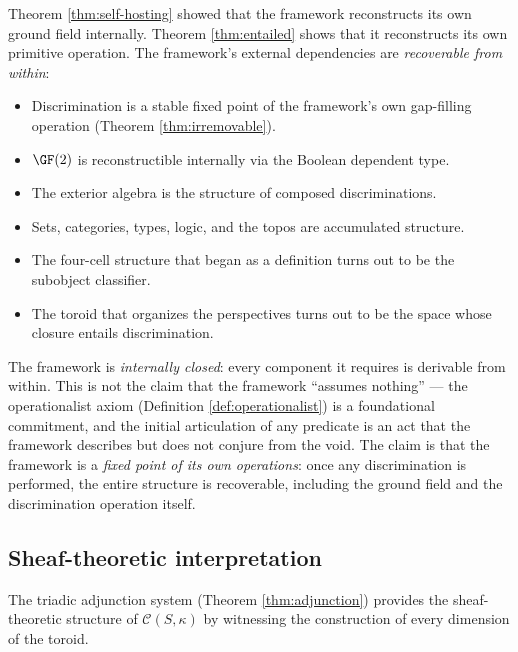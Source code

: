 \begin{remark}
Theorem \ref{thm:self-hosting} showed that the framework
reconstructs its own ground field internally.
Theorem \ref{thm:entailed} shows that it reconstructs
its own primitive operation. The framework's external
dependencies are \emph{recoverable from within}:
\begin{itemize}[nosep]
  \item Discrimination is a stable fixed point of the
    framework's own gap-filling operation
    (Theorem \ref{thm:irremovable}).
  \item $\GF(2)$ is reconstructible internally via the
    Boolean dependent type.
  \item The exterior algebra is the structure of composed
    discriminations.
  \item Sets, categories, types, logic, and the topos are
    accumulated structure.
  \item The four-cell structure that began as a definition
    turns out to be the subobject classifier.
  \item The toroid that organizes the perspectives turns
    out to be the space whose closure entails
    discrimination.
\end{itemize}
The framework is \emph{internally closed}: every
component it requires is derivable from within. This is
not the claim that the framework ``assumes nothing'' ---
the operationalist axiom (Definition
\ref{def:operationalist}) is a foundational
commitment, and the initial articulation of any predicate
is an act that the framework describes but does not
conjure from the void. The claim is that the framework
is a \emph{fixed point of its own operations}: once any
discrimination is performed, the entire structure is
recoverable, including the ground field and the
discrimination operation itself.
\end{remark}

\subsection{Sheaf-theoretic interpretation}\label{sec:sheaf}

The triadic adjunction system (Theorem \ref{thm:adjunction})
provides the sheaf-theoretic structure of
$\mathcal{C}(S,\kappa)$ by witnessing the construction of
every dimension of the toroid.

